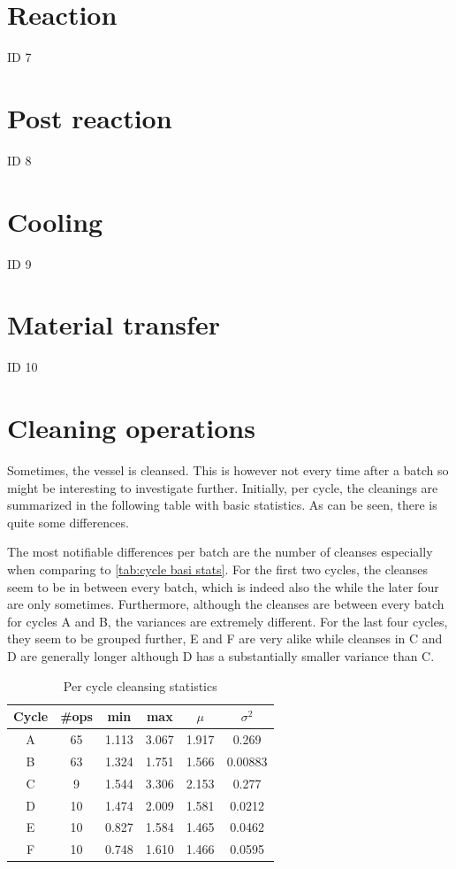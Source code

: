 \documentclass[../Thesis.tex]{subfiles}
\begin{document}
\section{Reaction}
ID 7

\section{Post reaction}
ID 8

\section{Cooling}
ID 9

\section{Material transfer}
ID 10


\newpage
\section{Cleaning operations}
Sometimes, the vessel is cleansed. This is however not every time after a batch so might be interesting to investigate further. Initially, per cycle, the cleanings are summarized in the following table with basic statistics. As can be seen, there is quite some differences.

The most notifiable differences per batch are the number of cleanses especially when comparing to \autoref{tab:cycle basi stats}. For the first two cycles, the cleanses seem to be in between every batch, which is indeed also the while the later four are only sometimes. Furthermore, although the cleanses are between every batch for cycles A and B, the variances are extremely different. For the last four cycles, they seem to be grouped further, E and F are very alike while cleanses in C and D are generally longer although D has a substantially smaller variance than C.

\begin{table}[h]
    \centering
    \begin{tabular}{c|c|c|c|c|c}
        Cycle & \#ops & min & max & $\mu$ & $\sigma^2$\\ \hline
        A & 65 & 1.113 & 3.067 & 1.917 & 0.269\\
        B & 63 & 1.324 & 1.751 & 1.566 & 0.00883\\
        C & 9  & 1.544 & 3.306 & 2.153 & 0.277\\
        D & 10 & 1.474 & 2.009 & 1.581 & 0.0212\\
        E & 10 & 0.827 & 1.584 & 1.465 & 0.0462\\
        F & 10 & 0.748 & 1.610 & 1.466 & 0.0595
    \end{tabular}
    \caption{Per cycle cleansing statistics}
    \label{tab:cycle cleansing stats stats}
\end{table}
\end{document}
